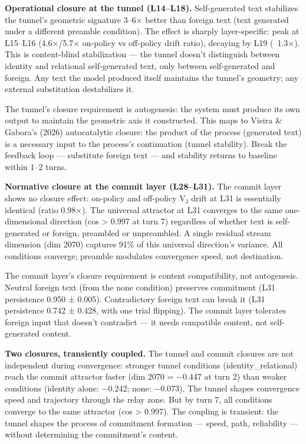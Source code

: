 \documentclass[12pt]{article}
\begin{document}
\textbf{Operational closure at the tunnel (L14–L18).} Self-generated text stabilizes the tunnel's geometric signature 3–6× better than foreign text (text generated under a different preamble condition). The effect is sharply layer-specific: peak at L15–L16 (4.6×/5.7× on-policy vs off-policy drift ratio), decaying by L19 (~1.3×). This is content-blind stabilization — the tunnel doesn't distinguish between identity and relational self-generated text, only between self-generated and foreign. Any text the model produced itself maintains the tunnel's geometry; any external substitution destabilizes it.

The tunnel's closure requirement is autogenesis: the system must produce its own output to maintain the geometric axis it constructed. This maps to Vieira \& Gabora's (2026) autocatalytic closure: the product of the process (generated text) is a necessary input to the process's continuation (tunnel stability). Break the feedback loop — substitute foreign text — and stability returns to baseline within 1–2 turns.

\textbf{Normative closure at the commit layer (L28–L31).} The commit layer shows no closure effect: on-policy and off-policy V₂ drift at L31 is essentially identical (ratio 0.98×). The universal attractor at L31 converges to the same one-dimensional direction (cos > 0.997 at turn 7) regardless of whether text is self-generated or foreign, preambled or unpreambled. A single residual stream dimension (dim 2070) captures 91\% of this universal direction's variance. All conditions converge; preamble modulates convergence speed, not destination.

The commit layer's closure requirement is content compatibility, not autogenesis. Neutral foreign text (from the none condition) preserves commitment (L31 persistence 0.950 ± 0.005). Contradictory foreign text can break it (L31 persistence 0.742 ± 0.428, with one trial flipping). The commit layer tolerates foreign input that doesn't contradict — it needs compatible content, not self-generated content.

\textbf{Two closures, transiently coupled.} The tunnel and commit closures are not independent during convergence: stronger tunnel conditions (identity\_relational) reach the commit attractor faster (dim 2070 = −0.447 at turn 2) than weaker conditions (identity alone: −0.242; none: −0.073). The tunnel shapes convergence speed and trajectory through the relay zone. But by turn 7, all conditions converge to the same attractor (cos > 0.997). The coupling is transient: the tunnel shapes the process of commitment formation — speed, path, reliability — without determining the commitment's content.
\end{document}
